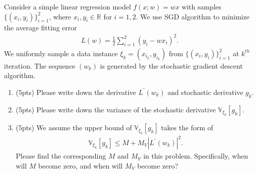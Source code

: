 \documentclass[11pt,letter,notitlepage]{article}
\begin{document}
\begin{solution}
   
\end{solution}

\newpage


\begin{exercise} 
Consider a simple linear regression model $ f(x;w) = wx $ with samples $ \{(x_i,y_i)\}_{i=1}^2 $, where $x_i,y_i \in \mathbb{R}$ for $i=1,2$. We use SGD algorithm to minimize the average fitting error 
\begin{align*}
L(w) = \frac{1}{2}\sum_{i=1}^{2}(y_i-wx_i)^2.
\end{align*}
We uniformly sample a data instance $ \xi_k=(x_{i_k}, y_{i_k}) $ from $ \{(x_i,y_i)\}_{i=1}^2 $ at $ k^{th} $ iteration. The sequence $(w_k)$ is generated by the stochastic gradient descent algorithm.
\begin{enumerate}
	\item (5pts)   Please write down the derivative $  L^\prime(w_k) $ and stochastic derivative $ g_k $.
	\item (5pts) Please write down the variance of the stochastic derivative $ \mathbb{V}_{\xi_k}[g_k] $.
	\item (5pts) We assume the upper bound of $ \mathbb{V}_{\xi_k}[g_k] $ takes the form of
	\begin{align*}
	\mathbb{V}_{\xi_k}[g_k]\leq M + M_V |L^\prime(w_k)|^2.
	\end{align*}
	Please find the corresponding $ M $ and $ M_V $ in this problem. Specifically, when will $ M $ become zero, and when will $ M_V $ become zero?
\end{enumerate}
\end{exercise}
\begin{solution}

\end{solution}
\newpage
\end{document}
